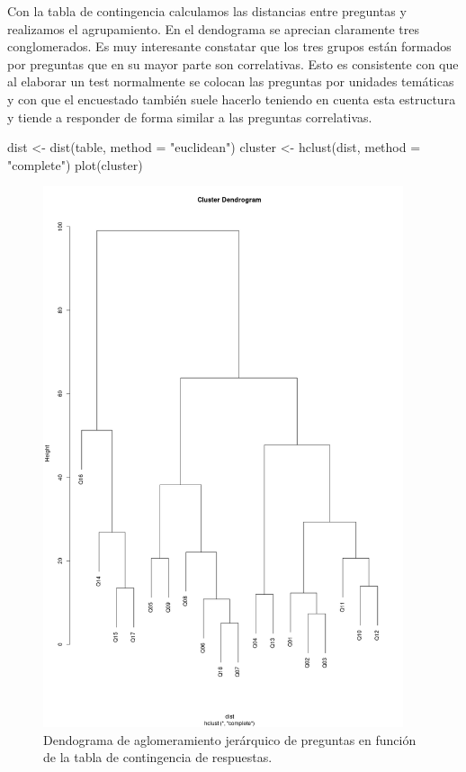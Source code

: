 \documentclass[
  12pt,
  a4paper,
  extrafontsizes,
  onecolumn,
  openright]{memoir}
\newenvironment{Shaded}{\begin{snugshade}}{\end{snugshade}}
\newcommand{\AttributeTok}[1]{\textcolor[rgb]{0.40,0.45,0.13}{#1}}
\newcommand{\FunctionTok}[1]{\textcolor[rgb]{0.28,0.35,0.67}{#1}}
\newcommand{\NormalTok}[1]{\textcolor[rgb]{0.00,0.23,0.31}{#1}}
\newcommand{\OtherTok}[1]{\textcolor[rgb]{0.00,0.23,0.31}{#1}}
\newcommand{\StringTok}[1]{\textcolor[rgb]{0.13,0.47,0.30}{#1}}
\begin{document}
\normalsize

Con la tabla de contingencia calculamos las distancias entre preguntas y
realizamos el agrupamiento. En el dendograma se aprecian claramente tres
conglomerados. Es muy interesante constatar que los tres grupos están
formados por preguntas que en su mayor parte son correlativas. Esto es
consistente con que al elaborar un test normalmente se colocan las
preguntas por unidades temáticas y con que el encuestado también suele
hacerlo teniendo en cuenta esta estructura y tiende a responder de forma
similar a las preguntas correlativas.

\begin{Shaded}
\begin{Highlighting}[]
\NormalTok{dist }\OtherTok{\textless{}{-}} \FunctionTok{dist}\NormalTok{(table, }\AttributeTok{method =} \StringTok{"euclidean"}\NormalTok{)}
\NormalTok{cluster }\OtherTok{\textless{}{-}} \FunctionTok{hclust}\NormalTok{(dist, }\AttributeTok{method =} \StringTok{"complete"}\NormalTok{)}
\FunctionTok{plot}\NormalTok{(cluster)}
\end{Highlighting}
\end{Shaded}

\begin{figure}[h]

{\centering \includegraphics[width=4.16667in,height=\textheight]{images/cluster.png}

}

\caption{Dendograma de aglomeramiento jerárquico de preguntas en función
de la tabla de contingencia de respuestas.}

\end{figure}
\end{document}
